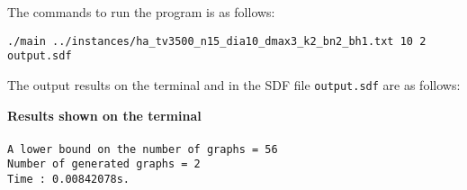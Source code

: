 \documentclass[11pt,titlepage,dvipdfmx,twoside]{article}
\begin{document}
The commands to run the program is as follows:

\bigskip

{\tt ./main ../instances/ha\_tv3500\_n15\_dia10\_dmax3\_k2\_bn2\_bh1.txt 10 2 output.sdf}

\bigskip

The output results on the terminal and in the SDF file {\tt output.sdf} are as follows:

\begin{oframed}
{\bf Results shown on the terminal}\\\\
{\tt A lower bound on the number of graphs = 56\\
Number of generated graphs = 2\\
Time : 0.00842078s.}
\end{oframed}
\end{document}
